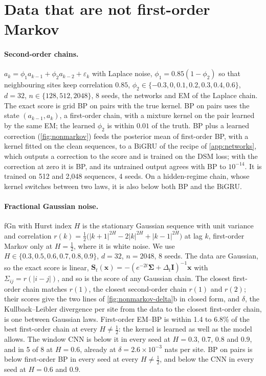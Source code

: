\documentclass{article}
\begin{document}
\section{Data that are not first-order Markov}
\label{app:nonmarkov}

\paragraph{Second-order chains.} $a_k=\phi_1a_{k-1}+\phi_2a_{k-2}+\varepsilon_k$ with Laplace noise,
$\phi_1=0.85(1-\phi_2)$ so that neighbouring sites keep correlation $0.85$, $\phi_2\in\{-0.3,0,0.1,0.2,0.3,0.4,0.6\}$,
$d=32$, $n\in\{128,512,2048\}$, 8 seeds, the networks and EM of the Laplace chain. The exact score is grid BP on pairs
with the true kernel. BP on pairs uses the state $(a_{k-1},a_k)$, a first-order chain, with a mixture kernel on the pair
learned by the same EM; the learned $\phi_2$ is within $0.01$ of the truth. BP plus a learned correction
(\cref{fig:nonmarkov}) feeds the posterior mean of first-order BP, with a kernel fitted on the clean sequences, to a
BiGRU of the recipe of \cref{app:networks}, which outputs a correction to the score and is trained on the DSM loss;
with the correction at zero it is BP, and its untrained output agrees with BP to $10^{-14}$. It is trained on 512 and
2{,}048 sequences, 4 seeds. On a hidden-regime chain, whose kernel switches between two laws, it is also below both BP
and the BiGRU.

\paragraph{Fractional Gaussian noise.} fGn with Hurst index $H$ is the stationary Gaussian sequence with unit variance
and correlation $r(k)=\frac12\big(|k+1|^{2H}-2|k|^{2H}+|k-1|^{2H}\big)$ at lag $k$, first-order Markov only at
$H=\frac12$, where it is white noise. We use $H\in\{0.3,0.5,0.6,0.7,0.8,0.9\}$, $d=32$, $n=2048$, 8 seeds. The data are
Gaussian, so the exact score is linear, $\mathbf S_t(\mathbf x)=-(e^{-2t}\boldsymbol\Sigma+\Delta_t\mathbf I)^{-1}
\mathbf x$ with $\Sigma_{ij}=r(|i-j|)$, and so is the score of any Gaussian chain. The closest first-order chain matches
$r(1)$, the closest second-order chain $r(1)$ and $r(2)$; their scores give the two lines of
\cref{fig:nonmarkov-delta}b in closed form, and $\delta$, the Kullback--Leibler divergence per site from the data to the
closest first-order chain, is one between Gaussian laws. First-order EM--BP is within 1.4 to 6.8\% of the best
first-order chain at every $H\neq\frac12$: the kernel is learned as well as the model allows. The window CNN is below it
in every seed at $H=0.3$, $0.7$, $0.8$ and $0.9$, and in 5 of 8 at $H=0.6$, already at $\delta=2.6\times10^{-3}$ nats per
site. BP on pairs is below first-order BP in every seed at every $H\neq\frac12$, and below the CNN in every seed at
$H=0.6$ and $0.9$.
\end{document}

